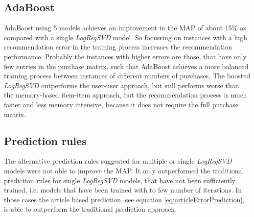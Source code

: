 \documentclass[10pt]{reportMaster}
\begin{document}
\subsection*{AdaBoost}
\label{sec:discAdaBoost}
AdaBoost using 5 models achieves an improvement in the MAP of about 15\% as compared with a single \textit{LogRegSVD} model.
So focussing on instances with a high recommendation error in the training process increases the recommendation performance.
Probably the instances with higher errors are those, that have only few entries in the purchase matrix, such that AdaBoost achieves a more balanced training process between instances of different numbers of purchases.
The boosted \textit{LogRegSVD} outperforms the user-user approach, but still performs worse than the memory-based item-item approach, but the recommendation process is much faster and less memory intensive, because it does not require the full purchase matrix.

\subsection*{Prediction rules}
\label{sec:discPredRules}
The alternative prediction rules suggested for multiple or single \textit{LogRegSVD} models were not able to improve the MAP.
It only outperformed the traditional prediction rules for single \textit{LogRegSVD} models, that have not been sufficiently trained, i.e. models that have been trained with to few number of iterations.
In those cases the article based prediction, see equation \ref{eq:articleErrorPrediction}, is able to outperform the traditional prediction approach.
\end{document}
